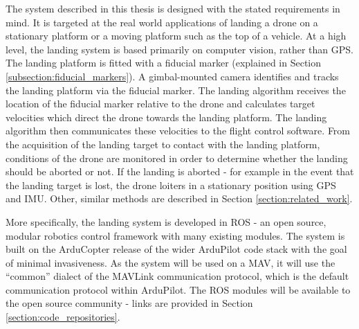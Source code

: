The system described in this thesis is designed with the stated requirements in mind. It is targeted at the real world applications of landing a drone on a stationary platform or a moving platform such as the top of a vehicle. At a high level, the landing system is based primarily on computer vision, rather than \gls{GPS}. The landing platform is fitted with a fiducial marker (explained in Section \ref{subsection:fiducial_markers}). A gimbal-mounted camera identifies and tracks the landing platform via the fiducial marker. The landing algorithm receives the location of the fiducial marker relative to the drone and calculates target velocities which direct the drone towards the landing platform. The landing algorithm then communicates these velocities to the flight control software. From the acquisition of the landing target to contact with the landing platform, conditions of the drone are monitored in order to determine whether the landing should be aborted or not. If the landing is aborted - for example in the event that the landing target is lost, the drone loiters in a stationary position using \gls{GPS} and \gls{IMU}. Other, similar methods are described in Section \ref{section:related_work}.

More specifically, the landing system is developed in \gls{ROS} - an open source, modular robotics control framework with many existing modules. The system is built on the ArduCopter release of the wider ArduPilot code stack with the goal of minimal invasiveness. As the system will be used on a \gls{MAV}, it will use the ``common'' dialect of the MAVLink communication protocol, which is the default communication protocol within ArduPilot. The \gls{ROS} modules will be available to the open source community - links are provided in Section \ref{section:code_repositories}.